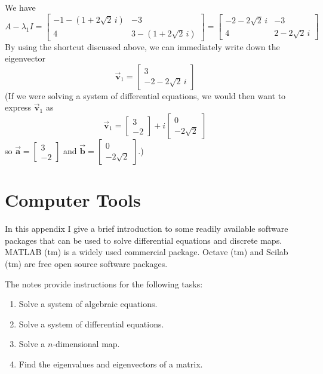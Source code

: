 \documentclass{book}
\newcommand{\BA}{\vec{\textbf{a}}}
\newcommand{\BB}{\vec{\textbf{b}}}
\newcommand{\BV}{\vec{\textbf{v}}}
\begin{document}
We have
\[
   A - \lambda_1 I = \begin{bmatrix}
                        -1-(1+2\sqrt{2}\,i) & -3 \\
			4 & 3-(1+2\sqrt{2}\,i)
                     \end{bmatrix}
		   = \begin{bmatrix}
		        -2-2\sqrt{2}\, i & -3 \\
			4 & 2-2\sqrt{2}\,i
		     \end{bmatrix}
\]
By using the shortcut discussed above, we can
immediately write down the eigenvector
\[
  \BV_1 = \begin{bmatrix} 3 \\ -2-2\sqrt{2}\, i \end{bmatrix}
\]
(If we were solving a system of differential equations, we would
then want to express $\BV_1$ as
\[
   \BV_1 = \begin{bmatrix} 3 \\ -2 \end{bmatrix}
           + i \begin{bmatrix} 0 \\ -2\sqrt{2} \end{bmatrix}
\]
so $\BA = \begin{bmatrix} 3 \\ -2\end{bmatrix}$
and $\BB = \begin{bmatrix} 0 \\ -2\sqrt{2} \end{bmatrix}$.)
%
%
%
\chapter{Computer Tools}
%
%
In this appendix I give a brief introduction to some
readily available software packages that can be used to solve
differential equations and discrete maps.  MATLAB (tm)
is a widely used commercial package.  Octave (tm) and
Scilab (tm) are free open source software packages.

The notes provide instructions for the following tasks:
\begin{enumerate}
\item Solve a system of algebraic equations.
\item Solve a system of differential equations.
\item Solve a $n$-dimensional map.
\item Find the eigenvalues and eigenvectors of a matrix.
\end{enumerate}
\end{document}
